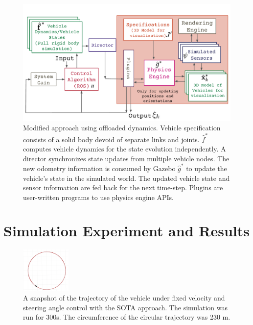 \documentclass[aps,pra,twocolumn,notitlepage,nofootinbib,superscriptaddress]{revtex4-1}
\begin{document}
\begin{figure}[htpb]
\centering
\includegraphics[angle=0,origin=c,trim={0.0cm 0.0cm 0.0cm 0.0cm},clip,width=1.0\linewidth]{ros_modified_approach.pdf}
\caption{Modified approach using offloaded dynamics. Vehicle specification consists of a solid body devoid of separate links and joints. $\hat{f}^*$ computes vehicle dynamics for the state evolution independently. A director synchronizes state updates from multiple vehicle nodes. The new odometry information is consumed by Gazebo $\hat{g}^*$ to update the vehicle's state in the simulated world. The updated vehicle state and sensor information are fed back for the next time-step. Plugins are user-written programs to use physics engine APIs.}
\label{fig:flowdiagram-modified}
\end{figure}



%

\section{Simulation Experiment and Results}
\label{sec:results}

\begin{figure}[htpb]
\centering
\includegraphics[angle=0,origin=c,trim={0.0cm 0.0cm 0.0cm 0.0cm},clip,width=0.22\textwidth]{rviz_screenshot_catvehicle_8ms.png}
\caption{A snapshot of the trajectory of the vehicle under fixed velocity and steering angle control with the SOTA approach. The simulation was run for 300s. The circumference of the circular trajectory was 230 m.}
\label{fig:rviz_screenshot_catvehicle_8ms}
\end{figure}
\end{document}
